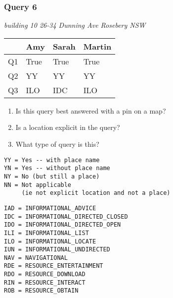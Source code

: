 \begin{frame}[fragile]
\frametitle{Query 6}
\vspace{1em}

\emph{building 10 26-34 Dunning Ave  Rosebery NSW}

\vfill

\begin{table}
  \centering
  \begin{tabular}{ l l l l }
    & \textbf{Amy} & \textbf{Sarah} & \textbf{Martin}\\
    \toprule
    Q1 & True & True & True\\
Q2 & YY & YY & YY\\
Q3 & ILO & IDC & ILO\\
    \bottomrule
  \end{tabular}
\end{table}

\vfill

\tiny{

\begin{enumerate}
\item Is this query best answered with a pin on a map?
\item Is a location explicit in the query?
\item What type of query is this?
\end{enumerate}

\vfill

\begin{multicols}{2}
\begin{verbatim}
YY = Yes -- with place name
YN = Yes -- without place name
NY = No (but still a place)
NN = Not applicable 
     (ie not explicit location and not a place)
\end{verbatim}

\columnbreak
\begin{verbatim}
IAD = INFORMATIONAL_ADVICE
IDC = INFORMATIONAL_DIRECTED_CLOSED
IDO = INFORMATIONAL_DIRECTED_OPEN
ILI = INFORMATIONAL_LIST
ILO = INFORMATIONAL_LOCATE
IUN = INFORMATIONAL_UNDIRECTED
NAV = NAVIGATIONAL
RDE = RESOURCE_ENTERTAINMENT
RDO = RESOURCE_DOWNLOAD
RIN = RESOURCE_INTERACT
ROB = RESOURCE_OBTAIN
\end{verbatim}
\end{multicols}
}

\end{frame}


